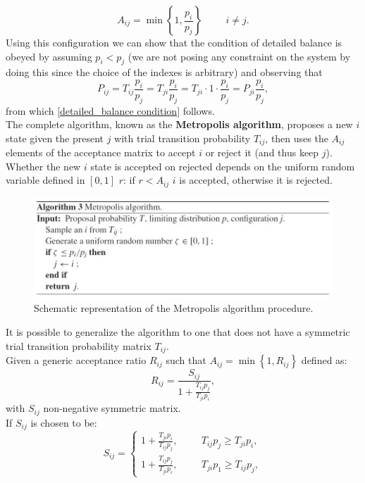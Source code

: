 \begin{equation}
    A_{ij}=\min{\left\{1,\frac{p_i}{p_j}\right\}}\hspace{1cm}i\neq j.
\end{equation}
Using this configuration we can show that the condition of detailed balance is obeyed by assuming $p_i<p_j$ (we are not posing any constraint 
on the system by doing this since the choice of the indexes is arbitrary) and observing that
\begin{equation}
    P_{ij}=T_{ij}\frac{p_i}{p_j}=T_{ji}\frac{p_i}{p_j}=T_{ji}\cdot 1\cdot\frac{p_i}{p_j}=P_{ji}\frac{p_i}{p_j},
\end{equation}
from which \ref{detailed_balance condition} follows.\\
The complete algorithm, known as the \textbf{Metropolis algorithm}, proposes a new $i$ state given the present $j$ with trial transition 
probability $T_{ij}$, then uses the $A_{ij}$ elements of the acceptance matrix to accept $i$ or reject it (and thus keep $j$). Whether the new $i$ state 
is accepted on rejected depends on the uniform random variable defined in $[0,1]$ $r$: if $r<A_{ij}$ $i$ is accepted, otherwise it 
is rejected.
\begin{figure}[H]
    \includegraphics[scale=0.8]{Metropolis_algo.jpg}
    \caption{Schematic representation of the Metropolis algorithm procedure.}
    \label{fig:Metropolis}
\end{figure}
It is possible to generalize the algorithm to one that does not have a symmetric trial transition probability matrix $T_{ij}$.\\
Given a generic acceptance ratio $R_{ij}$ such that $A_{ij}=\min\left\{1,R_{ij}\right\}$ defined as:
\begin{equation}
    R_{ij}=\frac{S_{ij}}{1+\frac{T_{ij}p_j}{T_{ji}p_i}},
\end{equation}
with $S_{ij}$ non-negative symmetric matrix.\\
If $S_{ij}$ is chosen to be:
\begin{equation}
    S_{ij}=
    \begin{cases}
        1+\frac{T_{ji}p_i}{T_{ij}p_j},\hspace{1cm}T_{ij}p_j\ge T_{ji}p_i,\\
        1+\frac{T_{ij}p_j}{T_{ji}p_i},\hspace{1cm}T_{ji}p_1\ge T_{ij}p_j,
    \end{cases}
\end{equation}

